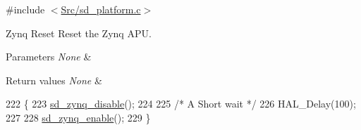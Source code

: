 {\ttfamily \#include $<$\mbox{\hyperlink{sd__platform_8c}{Src/sd\+\_\+platform.\+c}}$>$}



Zynq Reset Reset the Zynq A\+PU. 


\begin{DoxyParams}{Parameters}
{\em None} & \\
\hline
\end{DoxyParams}

\begin{DoxyRetVals}{Return values}
{\em None} & \\
\hline
\end{DoxyRetVals}

\begin{DoxyCode}
222 \{
223     \mbox{\hyperlink{group___s_d___platform___boot___config_gaaaa432cbbf3382d321107a38a56b9bef}{sd\_zynq\_disable}}();
224     
225     \textcolor{comment}{/* A Short wait */}
226     HAL\_Delay(100);
227     
228     \mbox{\hyperlink{group___s_d___platform___boot___config_gac30b9aa0032a9a8598735242c7cfa5bc}{sd\_zynq\_enable}}();
229 \}
\end{DoxyCode}
